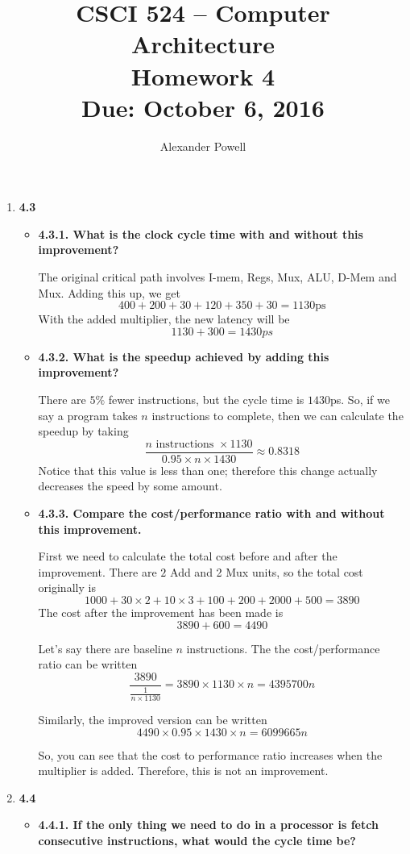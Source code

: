 \documentclass[10pt]{article} %
\title{CSCI 524 -- Computer Architecture \\
Homework 4 \\
{\large{\bf Due: October 6, 2016}}}
\date{}
\author{Alexander Powell}
\begin{document}
\maketitle
\begin{enumerate}

\item %
\textbf{4.3}
\begin{itemize}
\item 
\textbf{4.3.1. What is the clock cycle time with and without this improvement? }

The original critical path involves I-mem, Regs, Mux, ALU, D-Mem and Mux.  Adding this up, we get
$$ 400 + 200 + 30 + 120 + 350 + 30 = 1130\text{ps} $$
With the added multiplier, the new latency will be 
$$ 1130 + 300 = 1430ps $$

\item 
\textbf{4.3.2. What is the speedup achieved by adding this improvement? }

There are $5\%$ fewer instructions, but the cycle time is $1430$ps.  So, if we say a program takes $n$ instructions to complete, then we can calculate the speedup by taking
$$ \dfrac{n \text{ instructions } \times 1130}{0.95 \times n \times 1430} \approx 0.8318 $$
Notice that this value is less than one; therefore this change actually decreases the speed by some amount.  

\item 
\textbf{4.3.3. Compare the cost/performance ratio with and without this improvement. }

First we need to calculate the total cost before and after the improvement.  There are $2$ Add and 2 Mux units, so the total cost originally is 
$$ 1000 + 30 \times 2 + 10 \times 3 + 100 + 200 + 2000 + 500 = 3890 $$
The cost after the improvement has been made is 
$$ 3890 + 600 = 4490 $$

Let's say there are baseline $n$ instructions.  The the cost/performance ratio can be written
$$ \dfrac{3890}{\frac{1}{n \times 1130}} = 3890 \times 1130 \times n = 4395700n $$

Similarly, the improved version can be written
$$ 4490 \times 0.95 \times 1430 \times n = 6099665n $$

So, you can see that the cost to performance ratio increases when the multiplier is added.  Therefore, this is not an improvement.  

\end{itemize}

\newpage

\item %
\textbf{4.4}
\begin{itemize}
\item 
\textbf{4.4.1. If the only thing we need to do in a processor is fetch consecutive instructions, what would the cycle time be? }


\end{itemize}
\end{enumerate}
\end{document}
